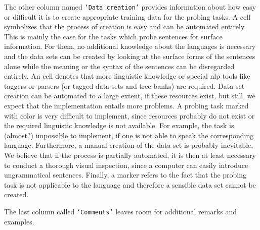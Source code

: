 The other column named \texttt{`Data creation'} provides information about how easy or difficult it is to create appropriate training data for the probing tasks. A  cell symbolizes that the process of creation is easy and can be automated entirely. This is mainly the case for the tasks which probe sentences for surface information. For them, no additional knowledge about the languages is necessary and the data sets can be created by looking at the surface forms of the sentences alone while the meaning or the syntax of the sentences can be disregarded entirely. An  cell denotes that more linguistic knowledge or special \gls{nlp} tools like taggers or parsers (or tagged data sets and tree banks) are required. Data set creation can be automated to a large extent, if these resources exist, but still, we expect that the implementation entails more problems. A probing task marked with  color is very difficult to implement, since resources probably do not exist or the required linguistic knowledge is not available. For example, the  task is (almost?) impossible to implement, if one is not able to speak the corresponding language. Furthermore, a manual creation of the data set is probably inevitable. We believe that if the process is partially automated, it is then at least necessary to conduct a thorough visual inspection, since a computer can easily introduce ungrammatical sentences. Finally, a  marker refers to the fact that the probing task is not applicable to the language and therefore a sensible data set cannot be created.

The last column called \texttt{`Comments'} leaves room for additional remarks and examples.

\begin{landscape}
	
\end{landscape}

\begin{landscape}
	
\end{landscape}

\begin{landscape}
	
\end{landscape}

